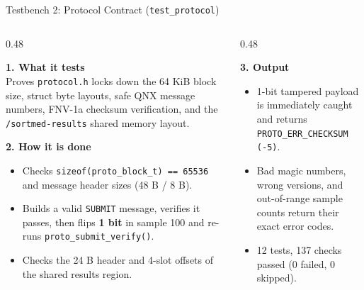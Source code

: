 \begin{frame}{Testbench 2: Protocol Contract (\texttt{test\_protocol})}
  \begin{columns}[t, onlytextwidth]
    \begin{column}{0.48\textwidth}
      \smalltext\compactitem
      \begin{highlight}
        \textbf{1. What it tests} \\
        Proves \texttt{protocol.h} locks down the 64 KiB block size, struct byte layouts, safe QNX message numbers, FNV-1a checksum verification, and the \texttt{/sortmed-results} shared memory layout.
      \end{highlight}
      \vskip0.5mm
      \begin{tech}
        \textbf{2. How it is done}
        \begin{itemize}
          \item Checks \texttt{sizeof(proto\_block\_t) == 65536} and message header sizes (48 B / 8 B).
          \item Builds a valid \texttt{SUBMIT} message, verifies it passes, then flips \textbf{1 bit} in sample 100 and re-runs \texttt{proto\_submit\_verify()}.
          \item Checks the 24 B header and 4-slot offsets of the shared results region.
        \end{itemize}
      \end{tech}
    \end{column}
    \begin{column}{0.48\textwidth}
      \smalltext\compactitem
      \begin{tech}
        \textbf{3. Output}
        \begin{itemize}
          \item 1-bit tampered payload is immediately caught and returns \texttt{PROTO\_ERR\_CHECKSUM (-5)}.
          \item Bad magic numbers, wrong versions, and out-of-range sample counts return their exact error codes.
          \item \num{12 tests, 137 checks passed (0 failed, 0 skipped)}.
        \end{itemize}
      \end{tech}
      \vskip1.5mm
    \end{column}
  \end{columns}
\end{frame}


